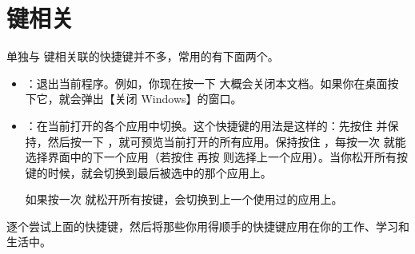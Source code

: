 \section{ 键相关}

单独与  键相关联的快捷键并不多，常用的有下面两个。

\begin{itemize}
  \item {}：退出当前程序。例如，你现在按一下  大概会关闭本文档。如果你在桌面按下它，就会弹出【关闭 Windows】的窗口。
  \item {}：在当前打开的各个应用中切换。这个快捷键的用法是这样的：先按住  并保持，然后按一下 ，就可预览当前打开的所有应用。保持按住 ，每按一次  就能选择界面中的下一个应用（若按住  再按  则选择上一个应用）。当你松开所有按键的时候，就会切换到最后被选中的那个应用上。

  如果按一次  就松开所有按键，会切换到上一个使用过的应用上。

\end{itemize}

\practice

逐个尝试上面的快捷键，然后将那些你用得顺手的快捷键应用在你的工作、学习和生活中。
